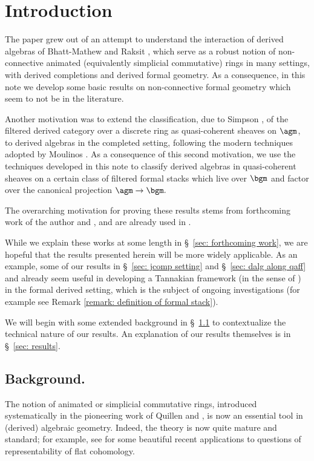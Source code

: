 \documentclass[10pt,reqno]{amsart}
\numberwithin{equation}{section}
\begin{document}
\section{Introduction}

The paper grew out of an attempt to understand the interaction of derived algebras of Bhatt-Mathew and Raksit \cite{Rak20}, which serve as a robust notion of non-connective animated (equivalently simplicial commutative) rings in many settings, with derived completions and derived formal geometry. As a consequence, in this note we develop some basic results on non-connective formal geometry which seem to not be in the literature.

Another motivation was to extend the classification, due to Simpson \cite{Simpson1997HodgeFiltrationNonabelian}, of the filtered derived category over a discrete ring as quasi-coherent sheaves on $\agm$, to derived algebras in the completed setting, following the modern techniques adopted by Moulinos \cite{Moulinos2021GeometryOfFiltrations}. As a consequence of this second motivation, we use the techniques developed in this note to classify derived algebras in quasi-coherent sheaves on a certain class of filtered formal stacks which live over $\bgm$ and factor over the canonical projection $\agm\to \bgm.$

The overarching motivation for proving these results stems from forthcoming work of the author \cite{Sah25Nyg} and \cite{Sah25Syn}, and are already used in \cite{Sah25DeRhamAffineness}. 

While we explain these works at some length in \S~\ref{sec: forthcoming work}, we are hopeful that the results presented herein will be more widely applicable. As an example, some of our results in \S~\ref{sec: jcomp setting} and \S~\ref{sec: dalg along qaff} and already seem useful in developing a Tannakian framework (in the sense of \cite{Lurie2011DAGVIII}) in the formal derived setting, which is the subject of ongoing investigations \cite{MundingerSahai_inprep} (for example see Remark \ref{remark: definition of formal stack}).

We will begin with some extended background in \S~\ref{sec: background} to contextualize the technical nature of our results. An explanation of our results themselves is in \S~\ref{sec: results}.

\subsection{Background.}\label{sec: background}
The notion of animated or simplicial commutative rings, introduced systematically in the pioneering work of Quillen \cite{Quillen1970HomologyCommutativeRings} and \cite{Quillen1970OnCohomologyCommutativeRings}, is now an essential tool in (derived) algebraic geometry. Indeed, the theory is now quite mature and standard; for example, see \cite{BraggOlsson2021RepresentabilityCohomologyFiniteFlat} for some beautiful recent applications to questions of representability of flat cohomology.
\end{document}

